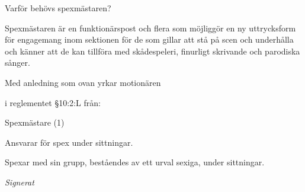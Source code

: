 \documentclass[../_main/handlingar.tex]{subfiles}
\begin{document}
Varför behövs spexmästaren?

Spexmästaren är en funktionärspost och flera som möjliggör en ny uttrycksform för engagemang inom sektionen för de som gillar att stå på scen och underhålla och känner att de kan tillföra med skådespeleri, finurligt skrivande och parodiska sånger.

Med anledning som ovan yrkar motionären
\begin{attsatser}
  \att i reglementet \S10:2:L från:\par
  \begin{emptylist}
    \item Spexmästare (1)
      \begin{dashlist}
        \item Ansvarar för spex under sittningar.
        \item Spexar med sin grupp, beståendes av ett urval sexiga, under sittningar. 
      \end{dashlist}
    \end{emptylist}
    
    
    
    
\end{attsatser}




\begin{signatures}{1}
    \textit{Signerat}
    \signature{Adam Ekblom}{}

\end{signatures}
\end{document}
